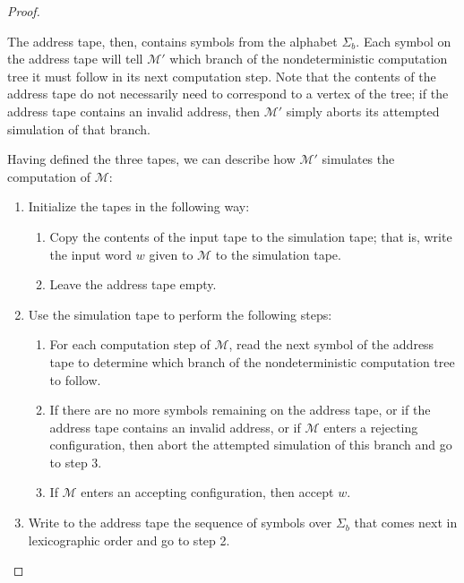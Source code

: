 \begin{theorem}
\begin{proof}
\begin{center}
\end{center}

The address tape, then, contains symbols from the alphabet $\Sigma_{b}$. Each symbol on the address tape will tell $\mathcal{M}'$ which branch of the nondeterministic computation tree it must follow in its next computation step. Note that the contents of the address tape do not necessarily need to correspond to a vertex of the tree; if the address tape contains an invalid address, then $\mathcal{M}'$ simply aborts its attempted simulation of that branch.

Having defined the three tapes, we can describe how $\mathcal{M}'$ simulates the computation of $\mathcal{M}$:
\begin{enumerate}
\item Initialize the tapes in the following way: 
	\begin{enumerate}
	\item Copy the contents of the input tape to the simulation tape; that is, write the input word $w$ given to $\mathcal{M}$ to the simulation tape.
	\item Leave the address tape empty.
	\end{enumerate}
\item Use the simulation tape to perform the following steps:
	\begin{enumerate}
	\item For each computation step of $\mathcal{M}$, read the next symbol of the address tape to determine which branch of the nondeterministic computation tree to follow.
	\item If there are no more symbols remaining on the address tape, or if the address tape contains an invalid address, or if $\mathcal{M}$ enters a rejecting configuration, then abort the attempted simulation of this branch and go to step 3.
	\item If $\mathcal{M}$ enters an accepting configuration, then accept $w$.
	\end{enumerate}
\item Write to the address tape the sequence of symbols over $\Sigma_{b}$ that comes next in lexicographic order and go to step 2. \qedhere
\end{enumerate}
\end{proof}
\end{theorem}

